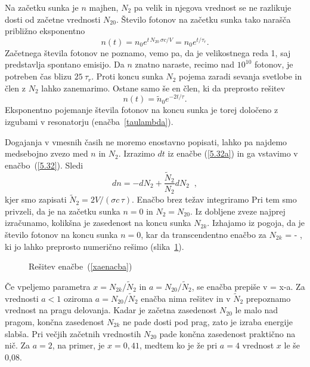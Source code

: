 Na začetku sunka je $n$ majhen, $N_2$ pa velik in njegova vrednost
se ne razlikuje dosti od začetne vrednosti $N_{20}$. Število fotonov
na začetku sunka tako narašča približno eksponentno
\begin{equation}  
n(t)=n_0e^{t\,N_{20}\,\sigma c/V}= n_0e^{t/\tau_r}.
\label{5.33}
\end{equation}
Začetnega števila fotonov ne poznamo, vemo pa, da je velikostnega reda 1,
saj predstavlja spontano emisijo. Da $n$ znatno naraste, recimo nad 
$10^{10}$ fotonov, je potreben čas blizu $25~\tau_r$.
Proti koncu sunka $N_2$ pojema zaradi sevanja svetlobe in člen z $N_2$ lahko 
zanemarimo. Ostane samo še en člen, ki da preprosto rešitev
\begin{equation}  
n(t)=\tilde{n}_0e^{-2t/\tau}.
\label{5.33a}
\end{equation}
Eksponentno pojemanje števila fotonov na koncu sunka je torej določeno z izgubami
v resonatorju (enačba~\ref{taulambda}). 

Dogajanja v vmesnih časih ne moremo enostavno popisati, lahko pa najdemo
medsebojno zvezo med $n$ in $N_2$. 
Izrazimo $dt$ iz enačbe (\ref{5.32a}) in ga vstavimo v enačbo~(\ref{5.32}).
Sledi
\begin{equation}
dn=-dN_{2}+\frac{\tilde{N}_2}{N_{2}}dN_{2}\;\;,  \label{5.341}
\end{equation}
kjer smo zapisati $\tilde{N}_{2}=2V/(\sigma c\,\tau)$.
Enačbo brez težav integriramo
Pri tem smo privzeli, da je na začetku sunka $n=0$ in $N_{2}=N_{20}$. 
Iz dobljene zveze najprej izračunamo, kolikšna je zasedenost na koncu sunka 
$N_{2k}$. Izhajamo iz pogoja, da je število fotonov na koncu sunka $n=0$, 
kar da transcendentno enačbo za $N_{2k}$
\beq
\ln {} = - ,
\label{xaenacba}
\eeq
ki jo lahko preprosto numerično rešimo (slika~\ref{fig:Qeq}).

\begin{figure}[h]
\centering
\def\svgwidth{90truemm} 

\caption{Rešitev enačbe~(\ref{xaenacba})}
\label{fig:Qeq}
\end{figure}

Če vpeljemo parametra $x=N_{2k}/\tilde{N}_2$ in $a=N_{20}/\tilde{N}_{2}$, se
enačba prepiše v 
\beq
\ln {}= x-a.
\eeq
Za vrednosti $a<1$ oziroma $a=N_{20}/\tilde{N}_{2}$ enačba nima rešitev in 
v $\tilde{N}_{2}$ prepoznamo vrednost na pragu delovanja. Kadar je začetna 
zasedenost $N_{20}$ le malo nad pragom, končna zasedenost $N_{2k}$ ne pade 
dosti pod prag, zato je izraba energije slabša. Pri večjih začetnih vrednostih 
$N_{20}$ pade končna zasedenost praktično na nič. Za $a=2$, na primer,
je $x=0,41$, medtem ko je že pri $a=4$ vrednost $x$ le še 0,08. 

